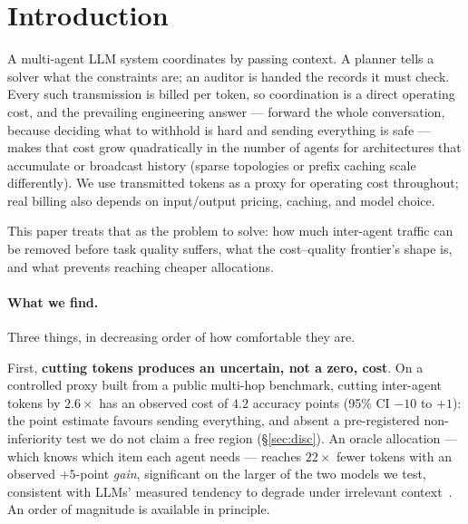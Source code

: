 \documentclass[sigconf,anonymous]{aamas}
\theoremstyle{remark}
\begin{document}

\maketitle

\section{Introduction}

A multi-agent LLM system coordinates by passing context. A planner
tells a solver what the constraints are; an auditor is handed the
records it must check. Every such transmission is billed per token, so
coordination is a direct operating cost, and the prevailing
engineering answer --- forward the whole conversation, because
deciding what to withhold is hard and sending everything is safe ---
makes that cost grow quadratically in the number of agents for
architectures that accumulate or broadcast history (sparse topologies
or prefix caching scale differently). We use transmitted tokens as a
proxy for operating cost throughout; real billing also depends on
input/output pricing, caching, and model choice.

This paper treats that as the problem to solve: how much inter-agent
traffic can be removed before task quality suffers, what the
cost--quality frontier's shape is, and what prevents reaching cheaper
allocations.

\paragraph{What we find.} Three things, in decreasing order of how
comfortable they are.

First, \textbf{cutting tokens produces an uncertain, not a zero,
cost}. On a controlled proxy built from a public multi-hop benchmark,
cutting inter-agent tokens by $2.6\times$ has an observed cost of $4.2$
accuracy points (95\% CI $-10$ to $+1$): the point estimate favours
sending everything, and absent a pre-registered non-inferiority test we
do not claim a free region (\S\ref{sec:disc}). An oracle allocation ---
which knows which item each agent needs --- reaches $22\times$ fewer
tokens with an observed $+5$-point \emph{gain}, significant on the
larger of the two models we test, consistent with LLMs' measured
tendency to
degrade under irrelevant
context~\cite{distracted2025,nolima2025,liu2024}. An order of magnitude
is available in principle.
\end{document}
